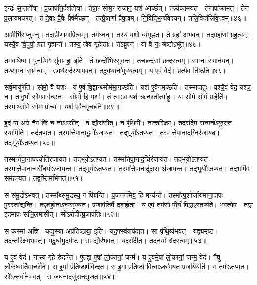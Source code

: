 इन्द्रः॑ स॒प्तहो᳚त्रा।
प्र॒जा\-प॑ति॒र्दश॑होत्रा।
तेषा॒ꣳ॒ सोम॒ꣳ॒ राजा॑नं॒ यश॑ आर्च्छत्।
तन्न्य॑कामयत।
तेनापा᳚क्रामत्।
तेन॑ प्र॒लाय॑मचरत्।
तं दे॒वाः प्रै॒षैः प्रैष॑मैच्छन्।
तत्प्रै॒षाणां᳚ प्रैष॒त्वम्।
नि॒विद्भि॒र्न्य॑वेदयन्।
तन्नि॒विदा᳚न्निवि॒त्त्वम्॥४६॥\ip

आ॒प्रीभि॑राप्नुवन्।
तदा॒प्रीणा॑माप्रि॒त्वम्।
तम॑घ्नन्।
तस्य॒ यशो॒ व्य॑गृह्णत।
ते ग्रहा॑ अभवन्।
तद्ग्रहा॑णां ग्रह॒त्वम्।
यस्यै॒वं वि॒दुषो॒ ग्रहा॑ गृ॒ह्यन्ते᳚।
तस्य॒ त्वे॑व गृ॑ही॒ताः।
ते᳚ऽब्रुवन्।
यो वै नः॒ श्रेष्ठो\-ऽभू᳚त्॥४७॥\ip

तम॑वधिष्म।
पुन॑रि॒मꣳ सु॑वामहा॒ इति॑।
तं छन्दो॑भिरसुवन्त।
तच्छन्द॑सां छन्द॒स्त्वम्।
साम्ना॒ समान॑यन्।
तथ्साम्नः॑ साम॒त्वम्।
उ॒क्थैरुद॑स्थापयन्।
तदु॒क्थाना॑मुक्थ॒त्वम्।
य ए॒वं वेद॑।
प्रत्ये॒व ति॑ष्ठति॥४८॥\ip

सर्व॒मायु॑रेति।
सोमो॒ वै यशः॑।
य ए॒वं वि॒द्वान्थ्सोम॑मा॒गच्छ॑ति।
यश॑ ए॒वैन॑मृच्छति।
तस्मा॑दाहुः।
यश्चै॒वं वेद॒ यश्च॒ न।
तावु॒भौ सोम॒माग॑च्छतः।
सोमो॒ हि यशः॑।
तं त्वाऽव यश॑ ऋच्छ॒तीत्या॑हुः।
यः सोमे॒ सोमं॒ प्राहेति॑।
तस्मा॒थ्सोमे॒ सोमः॒ प्रोच्यः॑।
यश॑ ए॒वैन॑मृच्छति॥४९॥\ip{}

इ॒दं वा अग्रे॒ नैव किं च॒ नाऽऽसी᳚त्।
न द्यौरा॑सीत्।
न पृ॑थि॒वी।
नान्तरि॑क्षम्।
तदस॑दे॒व सन्मनो॑\-ऽकुरुत॒ स्यामिति॑।
तद॑तप्यत।
तस्मा᳚त्तेपा॒नाद्धू॒मो॑\-ऽजायत।
तद्भूयो॑\-ऽतप्यत।
तस्मा᳚त्तेपा॒ना\-द॒ग्निर॑जायत।
तद्भूयो॑\-ऽतप्यत॥५०॥\ip

तस्मा᳚त्तेपा॒नाज्ज्योति॑रजायत।
तद्भूयो॑\-ऽतप्यत।
तस्मा᳚त्तेपा॒ना\-द॒र्चिर॑जायत।
तद्भूयो॑\-ऽतप्यत।
तस्मा᳚त्तेपा॒नान्मरी॑चयो\-ऽजायन्त।
तद्भूयो॑\-ऽतप्यत।
तस्मा᳚त्तेपा॒नादु॑दा॒रा अ॑जायन्त।
तद्भूयो॑\-ऽतप्यत।
तद॒भ्रमि॑व॒ सम॑हन्यत।
तद्व॒स्तिम॑भिनत्॥५१॥\ip

स स॑मु॒द्रो॑\-ऽभवत्।
तस्मा᳚थ्समु॒द्रस्य॒ न पि॑बन्ति।
प्र॒जन॑नमिव॒ हि मन्य॑न्ते।
तस्मा᳚त्प॒शोर्जाय॑माना॒दापः॑ पु॒रस्ता᳚द्यन्ति।
तद्दश॑हो॒ता\-ऽन्व॑सृज्यत।
प्र॒जा\-प॑ति॒र्वै दश॑होता।
य ए॒वं तप॑सो वी॒र्यं॑ वि॒द्वाꣴस्तप्य॑ते।
भव॑त्ये॒व।
तद्वा इ॒दमापः॑ सलि॒लमा॑सीत्।
सो॑ऽरोदीत्प्र॒जा\-प॑तिः॥५२॥\ip

स कस्मा॑ अज्ञि।
यद्य॒स्या अप्र॑तिष्ठाया॒ इति॑।
यद॒फ्स्व॑वाप॑द्यत।
सा पृ॑थि॒व्य॑भवत्।
यद्व्यमृ॑ष्ट।
तद॒न्तरि॑क्षम\-भवत्।
यदू॒र्ध्वमु॒दमृ॑ष्ट।
सा द्यौर॑भवत्।
यदरो॑दीत्।
तद॒नयो॑ रोद॒स्त्वम्॥५३॥\ip

य ए॒वं वेद॑।
नास्य॑ गृ॒हे रु॑दन्ति।
ए॒तद्वा ए॒षां लो॒कानां॒ जन्म॑।
य ए॒वमे॒षां लो॒कानां॒ जन्म॒ वेद॑।
नैषु लो॒केष्वार्ति॒मार्च्छ॑ति।
स इ॒मां प्र॑ति॒ष्ठाम॑विन्दत।
स इ॒मां प्र॑ति॒ष्ठां वि॒त्वा\-ऽका॑मयत॒ प्रजा॑ये॒येति॑।
स तपो॑\-ऽतप्यत।
सो᳚ऽन्तर्वा॑नभवत्।
स ज॒घना॒दसु॑रान\-सृजत॥५४॥\ip

